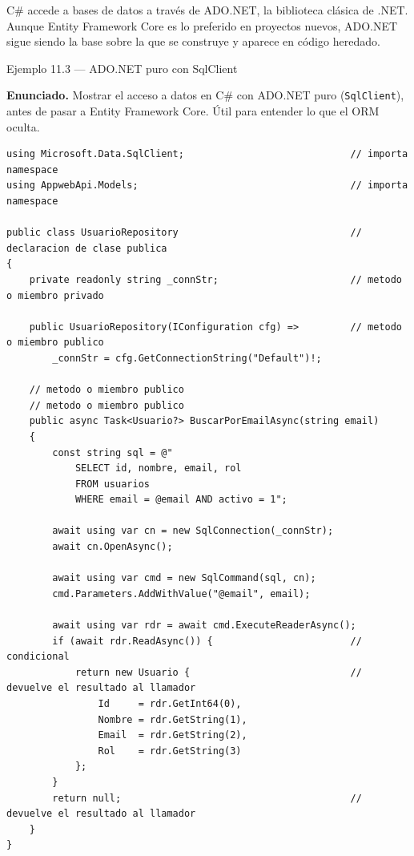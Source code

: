 \documentclass[11pt,a4paper,openany]{book}
\begin{document}
C\# accede a bases de datos a través de ADO.NET, la
biblioteca clásica de .NET. Aunque Entity Framework Core es lo
preferido en proyectos nuevos, ADO.NET sigue siendo la base sobre
la que se construye y aparece en código heredado.


\begin{cajaejemplo}{Ejemplo 11.3 --- ADO.NET puro con SqlClient}

\textbf{Enunciado.} Mostrar el acceso a datos en C\# con ADO.NET puro (\texttt{SqlClient}), antes de pasar a Entity Framework Core. Útil para entender lo que el ORM oculta.

\begin{lstlisting}[style=cs,caption={UsuarioRepository.cs},label=lst:11.6]
using Microsoft.Data.SqlClient;                             // importa namespace
using AppwebApi.Models;                                     // importa namespace

public class UsuarioRepository                              // declaracion de clase publica
{
    private readonly string _connStr;                       // metodo o miembro privado

    public UsuarioRepository(IConfiguration cfg) =>         // metodo o miembro publico
        _connStr = cfg.GetConnectionString("Default")!;

    // metodo o miembro publico
    // metodo o miembro publico
    public async Task<Usuario?> BuscarPorEmailAsync(string email)
    {
        const string sql = @"
            SELECT id, nombre, email, rol
            FROM usuarios
            WHERE email = @email AND activo = 1";

        await using var cn = new SqlConnection(_connStr);
        await cn.OpenAsync();

        await using var cmd = new SqlCommand(sql, cn);
        cmd.Parameters.AddWithValue("@email", email);

        await using var rdr = await cmd.ExecuteReaderAsync();
        if (await rdr.ReadAsync()) {                        // condicional
            return new Usuario {                            // devuelve el resultado al llamador
                Id     = rdr.GetInt64(0),
                Nombre = rdr.GetString(1),
                Email  = rdr.GetString(2),
                Rol    = rdr.GetString(3)
            };
        }
        return null;                                        // devuelve el resultado al llamador
    }
}
\end{lstlisting}
\end{cajaejemplo}
\end{document}
